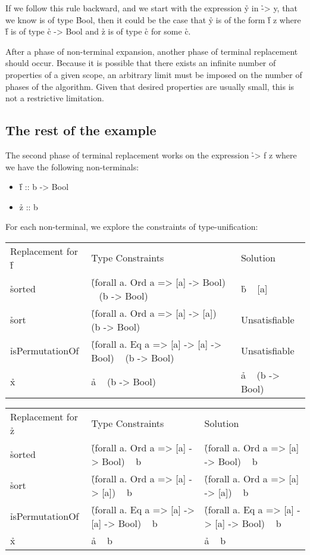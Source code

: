 \documentclass[a4paper, 11pt]{article}
\begin{document}
If we follow this rule backward, and we start with the expression \h{y} in \h{\x -> y}, that we know is of type \h{Bool}, then it could be the case that \h{y} is of the form \h{f z} where \h{f} is of type \h{c -> Bool} and \h{z} is of type \h{c} for some \h{c}.

After a phase of non-terminal expansion, another phase of terminal replacement should occur.
Because it is possible that there exists an infinite number of properties of a given scope, an arbitrary limit must be imposed on the number of phases of the algorithm.
Given that desired properties are usually small, this is not a restrictive limitation.

\subsection{The rest of the example}
The second phase of terminal replacement works on the expression \h{\x -> f z} where we have the following non-terminals:

\begin{itemize}
  \item \h{f :: b -> Bool}
  \item \h{z :: b}
\end{itemize}

For each non-terminal, we explore the constraints of type-unification:

\begin{tabular}{lll}
  Replacement for \h{f} & Type Constraints & Solution \\
  \h{sorted} & \h{(forall a. Ord a => [a] -> Bool) ~ (b -> Bool)} & \h{b ~ [a]} \\
  \h{sort} & \h{(forall a. Ord a => [a] -> [a]) ~ (b -> Bool)} & Unsatisfiable \\
  \h{isPermutationOf} & \h{(forall a. Eq a => [a] -> [a] -> Bool) ~ (b -> Bool)} & Unsatisfiable \\
  \h{x} & \h{a ~ (b -> Bool)} & \h{a ~ (b -> Bool)} \\
\end{tabular}

\begin{tabular}{lll}
  Replacement for \h{z} & Type Constraints & Solution \\
  \h{sorted} & \h{(forall a. Ord a => [a] -> Bool) ~ b} & \h{(forall a. Ord a => [a] -> Bool) ~ b} \\
  \h{sort} & \h{(forall a. Ord a => [a] -> [a]) ~ b} & \h{(forall a. Ord a => [a] -> [a]) ~ b} \\
  \h{isPermutationOf} & \h{(forall a. Eq a => [a] -> [a] -> Bool) ~ b} & \h{(forall a. Eq a => [a] -> [a] -> Bool) ~ b} \\
  \h{x} & \h{a ~ b} & \h{a ~ b} \\
\end{tabular}
\end{document}
